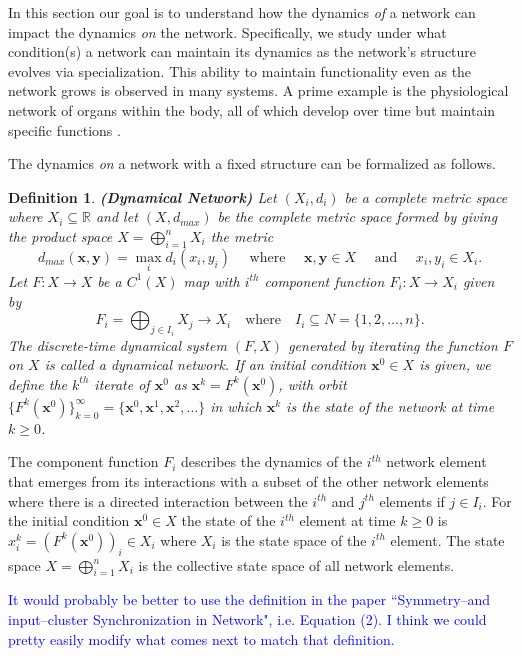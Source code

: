 \documentclass[10pt]{elsarticle}
\newtheorem{definition}{Definition}
\theoremstyle{remark}
\begin{document}
In this section our goal is to understand how the dynamics \emph{of} a network can impact the dynamics \emph{on} the network. Specifically, we study under what condition(s) a network can maintain its dynamics as the network's structure evolves via specialization. This ability to maintain functionality even as the network grows is observed in many systems. A prime example is the physiological network of organs within the body, all of which develop over time but maintain specific functions \cite{Plamen2015}.

The dynamics \emph{on} a network with a fixed structure can be formalized as follows.

\begin{definition}\label{def:dn}{\textbf{\emph{(Dynamical Network)}}}
Let $(X_i,d_i)$ be a complete metric space where $X_i\subseteq \mathbb{R}$ and let $(X,d_{max})$ be the complete metric space formed by giving the product space $X=\bigoplus_{i=1}^n X_i$ the metric
\[
d_{max}(\mathbf{x},\mathbf{y}) = \max_i d_i(x_i,y_i) \quad \text{ where } \quad \mathbf{x},\mathbf{y} \in X \quad \text{ and } \quad x_i,y_i \in X_i.
\]
Let $F:X \to X$  be a $C^1(X)$ map with $i^{th}$ component function $F_i:X\to X_i$ given by
\[
F_i = \bigoplus_{j\in I_i}X_j\rightarrow X_i \quad \text{where} \quad I_i\subseteq N=\{1,2,\dots,n\}.
\]
The discrete-time dynamical system $(F,X)$ generated by iterating the function $F$ on $X$ is called a \emph{dynamical network}. If an initial condition $\mathbf{x}^0\in X$ is given, we define the $k^{th}$ \emph{iterate} of $\mathbf{x}^0$ as $\mathbf{x}^k=F^k(\mathbf{x}^0)$, with orbit $\{F^k(\mathbf{x}^0)\}_{k=0}^\infty=\{\mathbf{x}^0,\mathbf{x}^1,\mathbf{x}^2,\hdots\}$ in which $\mathbf{x}^k$ is the state of the network at time $k \ge 0$.
\end{definition}

The component function $F_i$ describes the dynamics of the $i^{th}$ network element that emerges from its interactions with a subset of the other network elements where there is a directed interaction between the $i^{th}$ and $j^{th}$ elements if $j\in I_i$. For the initial condition $\mathbf{x}^0\in X$ the state of the $i^{th}$ element at time $k\ge 0$ is $x^k_i=(F^k(\mathbf{x}^0))_i\in X_i$ where $X_i$ is the state space of the $i^{th}$ element. The state space $X=\bigoplus_{i=1}^n X_i$ is the collective state space of all network elements.

\begin{center}
    \textcolor{blue}{It would probably be better to use the definition in the paper ``Symmetry--and input--cluster Synchronization in Network", i.e. Equation (2). I think we could pretty easily modify what comes next to match that definition.}
\end{center}
\end{document}

